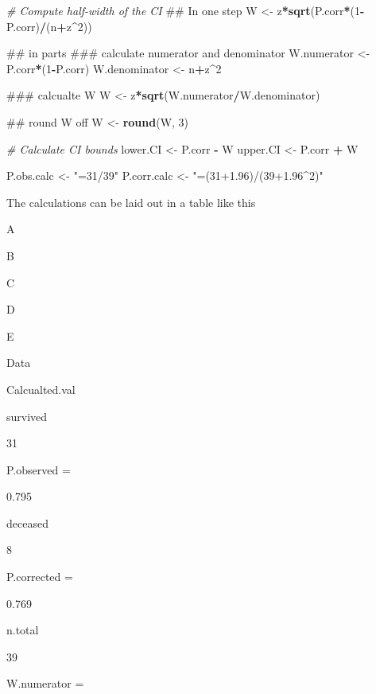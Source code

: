 \documentclass[]{book}
\newenvironment{Shaded}{\begin{snugshade}}{\end{snugshade}}
\newcommand{\KeywordTok}[1]{\textcolor[rgb]{0.13,0.29,0.53}{\textbf{#1}}}
\newcommand{\DecValTok}[1]{\textcolor[rgb]{0.00,0.00,0.81}{#1}}
\newcommand{\StringTok}[1]{\textcolor[rgb]{0.31,0.60,0.02}{#1}}
\newcommand{\CommentTok}[1]{\textcolor[rgb]{0.56,0.35,0.01}{\textit{#1}}}
\newcommand{\OperatorTok}[1]{\textcolor[rgb]{0.81,0.36,0.00}{\textbf{#1}}}
\newcommand{\NormalTok}[1]{#1}
\theoremstyle{definition}
\theoremstyle{definition}
\theoremstyle{definition}
\theoremstyle{remark}
\begin{document}
\begin{Shaded}
\begin{Highlighting}[]
\CommentTok{# Compute half-width of the CI}
\NormalTok{## In one step}
\NormalTok{W <-}\StringTok{ }\NormalTok{z}\OperatorTok{*}\KeywordTok{sqrt}\NormalTok{(P.corr}\OperatorTok{*}\NormalTok{(}\DecValTok{1}\OperatorTok{-}\NormalTok{P.corr)}\OperatorTok{/}\NormalTok{(n}\OperatorTok{+}\NormalTok{z}\OperatorTok{^}\DecValTok{2}\NormalTok{))}

\NormalTok{## in parts}
\NormalTok{### calculate numerator and denominator}
\NormalTok{W.numerator   <-}\StringTok{ }\NormalTok{P.corr}\OperatorTok{*}\NormalTok{(}\DecValTok{1}\OperatorTok{-}\NormalTok{P.corr)}
\NormalTok{W.denominator <-}\StringTok{ }\NormalTok{n}\OperatorTok{+}\NormalTok{z}\OperatorTok{^}\DecValTok{2}

\NormalTok{### calcualte W}
\NormalTok{W             <-}\StringTok{ }\NormalTok{z}\OperatorTok{*}\KeywordTok{sqrt}\NormalTok{(W.numerator}\OperatorTok{/}\NormalTok{W.denominator)}
  
\NormalTok{## round W off }
\NormalTok{W <-}\StringTok{ }\KeywordTok{round}\NormalTok{(W, }\DecValTok{3}\NormalTok{)}

\CommentTok{# Calculate CI bounds}
\NormalTok{lower.CI <-}\StringTok{ }\NormalTok{P.corr }\OperatorTok{-}\StringTok{ }\NormalTok{W}
\NormalTok{upper.CI <-}\StringTok{ }\NormalTok{P.corr }\OperatorTok{+}\StringTok{ }\NormalTok{W}

\NormalTok{P.obs.calc  <-}\StringTok{ "=31/39"}
\NormalTok{P.corr.calc <-}\StringTok{ "=(31+1.96)/(39+1.96^2)"}
\end{Highlighting}
\end{Shaded}

The calculations can be laid out in a table like this

A

B

C

D

E

Data

Calcualted.val

survived

31

P.observed =

0.795

deceased

8

P.corrected =

0.769

n.total

39

W.numerator =
\end{document}
